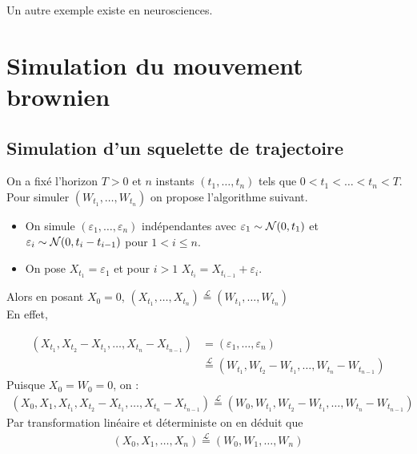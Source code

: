 Un autre exemple existe en neurosciences.

\section{Simulation du mouvement brownien}

\subsection{Simulation d'un squelette de trajectoire}

On a fixé l'horizon $T>0$ et $n$ instants $(t_1,\ldots,t_n)$ tels que $0 < t_1 <\ldots <t_n < T$. Pour simuler $(W_{t_1}, \ldots, W_{t_n})$ on propose l'algorithme suivant.
\begin{itemize}
  \item On simule $(\varepsilon_1, \ldots, \varepsilon_n)$ indépendantes avec $\varepsilon_1 \sim \mathcal{N}(0,t_1)$ et $\varepsilon_i \sim \mathcal{N}(0, t_i - t_{i-1})$ pour $1 < i \leq n$.
  \item On pose $X_{t_1} = \varepsilon_1$ et pour $i>1$ $X_{t_i} = X_{t_{i-1}} + \varepsilon_i$.
\end{itemize}
Alors en posant $X_0 = 0$, $(X_{t_1}, \ldots, X_{t_n}) \overset{\mathcal{L}}{=} (W_{t_1}, \ldots, W_{t_n})$ \\

En effet, 

\begin{equation*}
\begin{split}
  (X_{t_1}, X_{t_2} - X_{t_1}, \ldots, X_{t_n} - X_{t_{n-1}}) &= (\varepsilon_1, \ldots, \varepsilon_n) \\
  &\overset{\mathcal{L}}{=} (W_{t_1}, W_{t_2} - W_{t_1}, \ldots, W_{t_n} - W_{t_{n-1}})
\end{split}
\end{equation*}
Puisque $X_0 = W_0 = 0$, on :
\begin{equation*}
\begin{split}
  (X_0, X_1, X_{t_1}, X_{t_2} - X_{t_1}, \ldots, X_{t_n} - X_{t_{n-1}}) \overset{\mathcal{L}}{=} (W_0, W_{t_1}, W_{t_2} - W_{t_1}, \ldots, W_{t_n} - W_{t_{n-1}})
\end{split}
\end{equation*}
Par transformation linéaire et déterministe on en déduit que 
\begin{equation*}
\begin{split}
  (X_0, X_1, \ldots, X_n) \overset{\mathcal{L}}{=} (W_0, W_1, \ldots, W_n)
\end{split}
\end{equation*}

